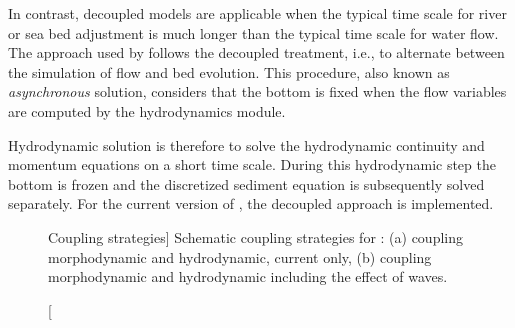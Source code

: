 In contrast, decoupled models are applicable when the typical time scale for river or sea bed adjustment
is much longer than the typical time scale for water flow. The approach used by \gaia{} follows the decoupled treatment, i.e., to alternate between the simulation of flow and bed evolution. This procedure, also known as \textit{asynchronous} solution, considers that the bottom is fixed when the flow variables are computed by the hydrodynamics module.

Hydrodynamic solution is therefore to solve the hydrodynamic continuity and momentum equations on a short time scale.
During this hydrodynamic step the bottom is frozen and the discretized sediment equation is subsequently solved separately.
For the current version of \gaia{}, the decoupled approach is implemented.


\begin{figure}[H]%
\begin{center}
%
\hfil
%
%
\hfil
%
%
\hfil
\mbox{}
\end{center}
\caption
[Coupling strategies]
{Schematic coupling strategies for \gaia: (a) coupling morphodynamic and hydrodynamic, current only, (b) coupling morphodynamic and hydrodynamic including the effect of waves.}
\label{fig:CouplingStrategies}
\end{figure}


